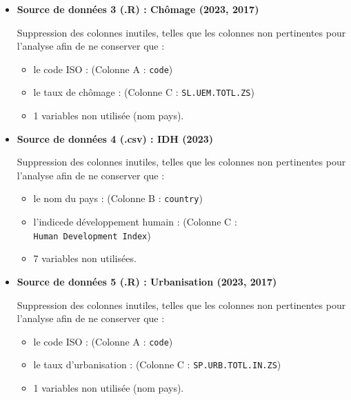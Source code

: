 \documentclass[mstat,12pt]{unswthesis}
\begin{document}
\medskip

\begin{itemize}
\item
  \textbf{Source de données 3 (.R) : Chômage (2023, 2017)}

  Suppression des colonnes inutiles, telles que les colonnes non
  pertinentes pour l'analyse afin de ne conserver que :

  \begin{itemize}
  \item
    le code ISO : (Colonne A : \texttt{code})
  \item
    le taux de chômage : (Colonne C : \texttt{SL.UEM.TOTL.ZS})
  \item
    1 variables non utilisée (nom pays).
  \end{itemize}
\end{itemize}

\medskip

\begin{itemize}
\item
  \textbf{Source de données 4 (.csv) : IDH (2023)}

  Suppression des colonnes inutiles, telles que les colonnes non
  pertinentes pour l'analyse afin de ne conserver que :

  \begin{itemize}
  \item
    le nom du pays : (Colonne B : \texttt{country})
  \item
    l'indicede développement humain : (Colonne C :
    \texttt{Human\ Development\ Index})
  \item
    7 variables non utilisées.
  \end{itemize}
\end{itemize}

\medskip

\begin{itemize}
\item
  \textbf{Source de données 5 (.R) : Urbanisation (2023, 2017)}

  Suppression des colonnes inutiles, telles que les colonnes non
  pertinentes pour l'analyse afin de ne conserver que :

  \begin{itemize}
  \item
    le code ISO : (Colonne A : \texttt{code})
  \item
    le taux d'urbanisation : (Colonne C : \texttt{SP.URB.TOTL.IN.ZS})
  \item
    1 variables non utilisée (nom pays).
  \end{itemize}
\end{itemize}
\end{document}

